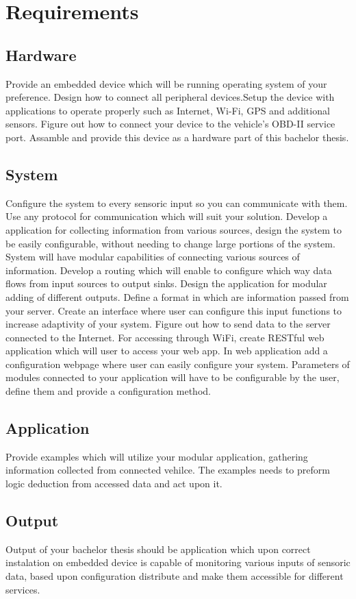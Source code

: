 \section{Requirements}

\subsection{Hardware}
Provide an embedded device which will be running operating system of your preference. Design how to connect all peripheral devices.Setup the device with applications to operate properly such as Internet, Wi-Fi, GPS and additional sensors. Figure out how to connect your device to the vehicle's OBD-II service port. Assamble and provide this device as a hardware part of this bachelor thesis.
\subsection{System}
Configure the system to every sensoric input so you can communicate with them. Use any protocol for communication which will suit your solution. Develop a application for collecting information from various sources, design the system to be easily configurable, without needing to change large portions of the system. System will have modular capabilities of connecting various sources of information. Develop a routing which will enable to configure which way data flows from input sources to output sinks. Design the application for modular adding of different outputs. Define a format in which are information passed from your server. Create an interface where user can configure this input functions to increase adaptivity of your system. Figure out how to send data to the server connected to the Internet. For accessing through WiFi, create RESTful web application which will user to access your web app. In web application add a configuration webpage where user can easily configure your system. Parameters of modules connected to your application will have to be configurable by the user, define them and provide a configuration method.
\subsection{Application}
Provide examples which will utilize your modular application, gathering information collected from connected vehilce. The examples needs to preform logic deduction from accessed data and act upon it.
\subsection{Output}
Output of your bachelor thesis should be application which upon correct instalation on embedded device is capable of monitoring various inputs of sensoric data, based upon configuration distribute and make them accessible for different services.



